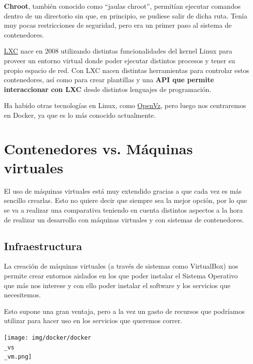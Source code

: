 \textbf{Chroot}, también conocido como “jaulas chroot”, permitían ejecutar comandos dentro de un directorio sin que, en principio, se pudiese salir de dicha ruta. Tenía muy pocas restricciones de seguridad, pero era un primer paso al sistema de contenedores.

\href{https://es.wikipedia.org/wiki/LXC}{LXC} nace en 2008 utilizando distintas funcionalidades del kernel Linux para proveer un entorno virtual donde poder ejecutar distintos procesos y tener su propio espacio de red. Con LXC nacen distintas herramientas para controlar estos contenedores, así como para crear plantillas y una \textbf{API que permite interaccionar con LXC} desde distintos lenguajes de programación.

Ha habido otras tecnologías en Linux, como \href{https://es.wikipedia.org/wiki/OpenVZ}{OpenVz}, pero luego nos centraremos en Docker, ya que es lo más conocido actualmente.


\section{Contenedores vs. Máquinas virtuales}

El uso de máquinas virtuales está muy extendido gracias a que cada vez es más sencillo crearlas. Esto no quiere decir que siempre sea la mejor opción, por lo que  se va a realizar una comparativa teniendo en cuenta distintos aspectos a la hora de realizar un desarrollo con máquinas virtuales y con sistemas de contenedores.


\subsection{Infraestructura}

La creación de máquinas virtuales (a través de sistemas como VirtualBox) nos permite crear entornos aislados en los que poder instalar el Sistema Operativo que más nos interese y con ello poder instalar el software y los servicios que necesitemos.

Esto supone una gran ventaja, pero a la vez un gasto de recursos que podríamos utilizar para hacer uso en los servicios que queremos correr.

\begin{center}
    \texttt{[image: img/docker/docker\\\_vs\\\_vm.png]}
\end{center}


